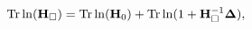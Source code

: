 \begin{equation}\label{split_m}
{\rm Tr}\ln ({\bf H}_{\Box})= {\rm Tr}\ln ({\bf H}_{0})+ {\rm Tr}\ln (1+{\bf H}_{\Box}^{-1}{\bf
\Delta}),
\end{equation}


